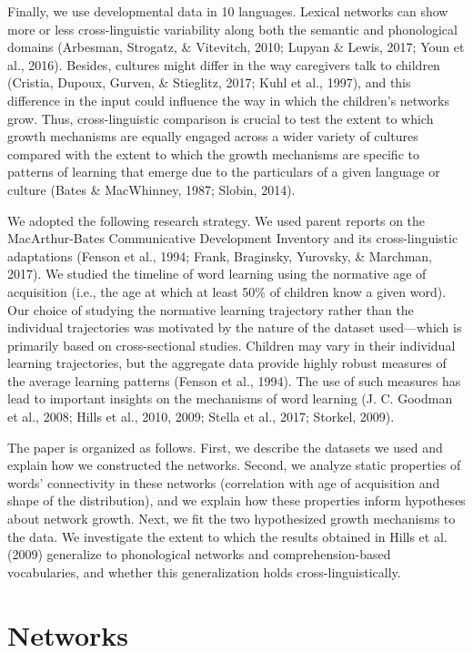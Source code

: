 \documentclass[english,floatsintext,man]{apa6}
\theoremstyle{definition}
\theoremstyle{definition}
\theoremstyle{definition}
\theoremstyle{remark}
\begin{document}
Finally, we use developmental data in 10 languages. Lexical networks can
show more or less cross-linguistic variability along both the semantic
and phonological domains (Arbesman, Strogatz, \& Vitevitch, 2010; Lupyan
\& Lewis, 2017; Youn et al., 2016). Besides, cultures might differ in
the way caregivers talk to children (Cristia, Dupoux, Gurven, \&
Stieglitz, 2017; Kuhl et al., 1997), and this difference in the input
could influence the way in which the children's networks grow. Thus,
cross-linguistic comparison is crucial to test the extent to which
growth mechanisms are equally engaged across a wider variety of cultures
compared with the extent to which the growth mechanisms are specific to
patterns of learning that emerge due to the particulars of a given
language or culture (Bates \& MacWhinney, 1987; Slobin, 2014).

We adopted the following research strategy. We used parent reports on
the MacArthur-Bates Communicative Development Inventory and its
cross-linguistic adaptations (Fenson et al., 1994; Frank, Braginsky,
Yurovsky, \& Marchman, 2017). We studied the timeline of word learning
using the normative age of acquisition (i.e., the age at which at least
50\% of children know a given word). Our choice of studying the
normative learning trajectory rather than the individual trajectories
was motivated by the nature of the dataset used---which is primarily
based on cross-sectional studies. Children may vary in their individual
learning trajectories, but the aggregate data provide highly robust
measures of the average learning patterns (Fenson et al., 1994). The use
of such measures has lead to important insights on the mechanisms of
word learning (J. C. Goodman et al., 2008; Hills et al., 2010, 2009;
Stella et al., 2017; Storkel, 2009).

The paper is organized as follows. First, we describe the datasets we
used and explain how we constructed the networks. Second, we analyze
static properties of words' connectivity in these networks (correlation
with age of acquisition and shape of the distribution), and we explain
how these properties inform hypotheses about network growth. Next, we
fit the two hypothesized growth mechanisms to the data. We investigate
the extent to which the results obtained in Hills et al. (2009)
generalize to phonological networks and comprehension-based
vocabularies, and whether this generalization holds
cross-linguistically.

\section{Networks}\label{networks}
\end{document}
